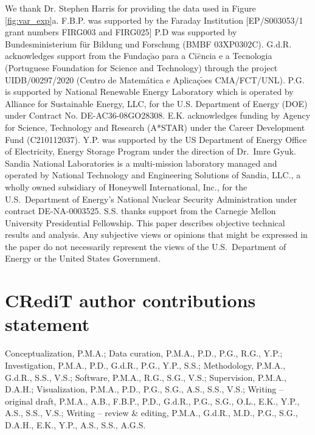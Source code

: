 \documentclass[journal=jpclcd,manuscript=article]{achemso}
\newcommand{\pbox}[1]{{
\fbox{
\parbox{0.8\textwidth}{  \fbox{$\triangleright$\textcolor{blue}{\textbf{Peter}:}} 
#1
}}}}
\begin{document}
We thank Dr. Stephen Harris for providing the data used in Figure \ref{fig:var_exp}a.
F.B.P. was supported by the Faraday Institution [EP/S003053/1 grant numbers FIRG003 and FIRG025]
P.D was supported by Bundesministerium für Bildung und Forschung (BMBF 03XP0302C).
G.d.R. acknowledges support from the {Funda{\c c}$\tilde{\text{a}}$o para a Ci$\hat{e}$ncia e a Tecnologia} (Portuguese Foundation for Science and Technology) through the project UIDB/00297/2020 (Centro de Matem\'atica e Aplica\c c$\tilde{\text{o}}$es CMA/FCT/UNL).
P.G. is supported by National Renewable Energy Laboratory which is operated by Alliance for Sustainable Energy, LLC, for the U.S. Department of Energy (DOE) under Contract No. DE-AC36-08GO28308. 
E.K. acknowledges funding by Agency for Science, Technology and Research (A*STAR) under the Career Development Fund (C210112037).
Y.P. was supported by the US Department of Energy Office of Electricity, Energy Storage Program under the direction of Dr.~Imre Gyuk. Sandia National Laboratories is a multi-mission laboratory managed and operated by National Technology and Engineering Solutions of Sandia, LLC., a wholly owned subsidiary of Honeywell International, Inc., for the U.S.~Department of Energy’s National Nuclear Security Administration under contract DE-NA-0003525.
S.S. thanks support from the Carnegie Mellon University Presidential Fellowship.
This paper describes objective technical results and analysis. Any subjective views or opinions that might be expressed in the paper do not necessarily represent the views of the U.S.~Department of Energy or the United States Government.

\section{CRediT author contributions statement}


Conceptualization, P.M.A.;
Data curation, P.M.A., P.D., P.G., R.G., Y.P.;
Investigation, P.M.A., P.D., G.d.R., P.G., Y.P., S.S.;
Methodology, P.M.A., G.d.R., S.S., V.S.;
Software, P.M.A., R.G., S.G., V.S.;
Supervision, P.M.A., D.A.H.;
Visualization, P.M.A., P.D., P.G., S.G., A.S., S.S., V.S.; 
Writing – original draft, P.M.A., A.B., F.B.P., P.D., G.d.R., P.G., S.G., O.L., E.K., Y.P., A.S., S.S., V.S.; 
Writing – review \& editing, P.M.A., G.d.R., M.D., P.G., S.G., D.A.H., E.K., Y.P., A.S., S.S., A.G.S.
\end{document}
